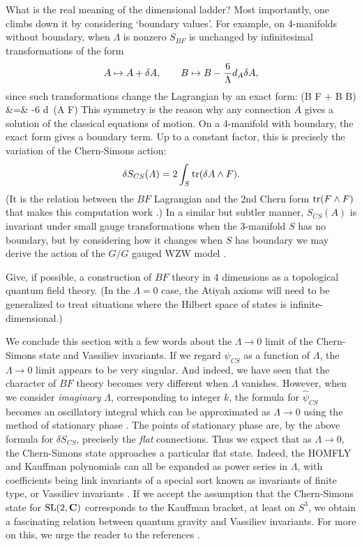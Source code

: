 What is the real meaning of the dimensional ladder?  Most importantly,
one climbs down it by considering `boundary values'.  For example, on
4-manifolds without boundary, when $\Lambda$ is nonzero $S_{BF}$ is
unchanged by infinitesimal transformations of the form
\[           A \mapsto A + \delta A, \qquad B \mapsto B - {6\over
\Lambda} d_A \delta A , \]
since such transformations change the Lagrangian
by an exact form:
\ban      \delta \tr(B \we F + {\Lambda{}}B \we B)
&=& -{6\over \Lambda} d\, \tr(\delta A \we F) \ean
This symmetry is the reason why any connection $A$ gives a solution of
the classical equations of motion.  On a 4-manifold with boundary, the
exact form gives a boundary term.  Up to a constant factor, this is
precisely the variation of the Chern-Simons action:
\[ \delta S_{CS}(A)
= 2 \int_S {\rm tr}(\delta A \wedge F) .\]
(It is the relation between the
$BF$ Lagrangian and the 2nd Chern form ${\rm tr}(F \wedge F)$ that makes this
computation work \cite{TJZW}.)  In a similar but subtler manner,
$S_{CS}(A)$ is invariant under small gauge transformations when the
3-manifold $S$ has no boundary, but by considering how it changes when
$S$ has boundary we may derive the action of the $G/G$ gauged WZW model
\cite{BT2}.

\begin{problem} \et Give, if possible, a construction of $BF$ theory in
4 dimensions as a topological quantum field theory.  (In the $\Lambda =
0$ case, the Atiyah axioms \cite{Atiyah} will need to be generalized to
treat situations where the Hilbert space of states is
infinite-dimensional.)  \end{problem}

We conclude this section with a few words about the $\Lambda \to 0$
limit of the Chern-Simons state and Vassiliev invariants.  If we regard
$\psi_{CS}$ as a function of $\Lambda$, the $\Lambda \to 0$ limit
appears to be very singular.  And indeed, we have seen that the
character of $BF$ theory becomes very different when $\Lambda$ vanishes.
However, when we consider {\it imaginary} $\Lambda$, corresponding to
integer $k$, the formula for $\hat \psi_{CS}$ becomes an oscillatory
integral which can be approximated as $\Lambda \to 0$ using the method
of stationary phase \cite{Witten2}.  The points of stationary phase are,
by the above formula for $\delta S_{CS}$, precisely the {\it flat}
connections.  Thus we expect that as $\Lambda \to 0$, the Chern-Simons
state approaches a particular flat state.  Indeed, the HOMFLY and
Kauffman polynomials can all be expanded as power series in $\Lambda$,
with coefficients being link invariants of a special sort known as
invariants of finite type, or Vassiliev invariants \cite{BarNatan}.  If
we accept the assumption that the Chern-Simons state for ${\rm SL}(2,{\bf C})$
corresponds to the Kauffman bracket, at least on $S^3$, we obtain a
fascinating relation between quantum gravity and Vassiliev invariants.
For more on this, we urge the reader to the references
\cite{Baez0,BGP,GP,Kauffman2}.

